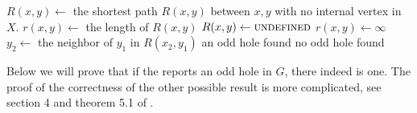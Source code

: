 \begin{algorithmic}[1]
				\ls $R(x, y) \gets$ the shortest path $R(x, y)$ between $x, y$ with no
				\lsx internal vertex in $X$.
				\ls $r(x, y) \gets$ the length of $R(x, y)$
			\mElse
				\ls $R(x, y) \gets \textsc{undefined}$
				\ls $r(x, y) \gets \infty$
			\mEndIf
			 \label{line:cudaStart}
				 \label{line:3vertex}
					 \label{line:cudaWorkStard}
						\ls $y_2 \gets$ the neighbor of $y_1$ in $R(x_2, y_1)$
						\ls \RETURN an odd hole found
						\mEndIf
					\mEndIf \label{line:cudaWorkEnd}
				\mEndFor
			\mEndFor \label{line:cudaEnd}
		\mEndFor
		\ls \RETURN no odd hole found
	\mEndProcedure
\end{algorithmic}



Below we will prove that if the  reports an odd hole in $G$, there indeed is one. The proof of the correctness of the other possible result is more complicated, see section 4 and theorem 5.1 of \cite{MC05}.

